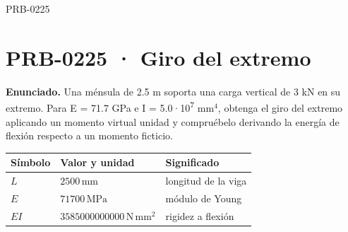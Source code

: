 \begin{studiumworked}{PRB-0225}

\section{PRB-0225 · Giro del extremo}

\textbf{Enunciado.} Una ménsula de 2.5 m soporta una carga vertical de 3 kN en su extremo. Para E = 71.7 GPa e I = 5.0·10\textsuperscript{7} mm$^4$, obtenga el giro del extremo aplicando un momento virtual unidad y compruébelo derivando la energía de flexión respecto a un momento ficticio.

\par\medskip\noindent\begin{tabular}{@{}p{.18\linewidth}p{.26\linewidth}p{.48\linewidth}@{}}
\toprule Símbolo & Valor y unidad & Significado\\\midrule
$L$ & $2500\,\mathrm{mm}$ & longitud de la viga\\
$E$ & $71700\,\mathrm{MPa}$ & módulo de Young\\
$EI$ & $3585000000000\,\mathrm{N\,mm^2}$ & rigidez a flexión\\
\bottomrule\end{tabular}\par\medskip


\end{studiumworked}
